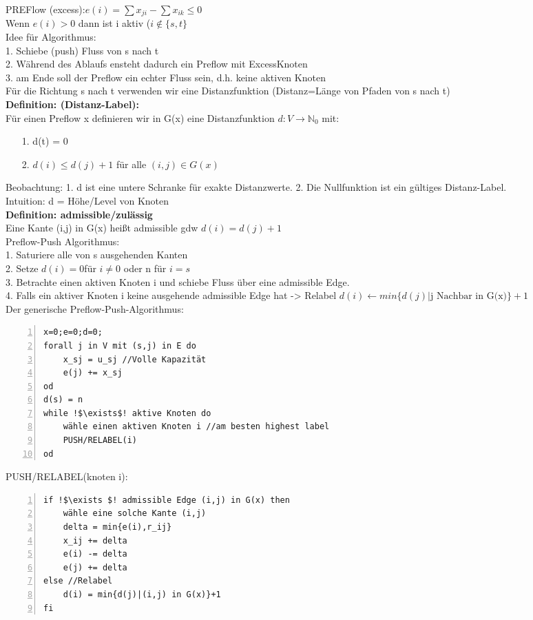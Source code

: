 \documentclass[a4paper]{article}
\begin{document}
PREFlow (excess):$e(i)=\sum x_{ji} - \sum x_{ik} \leq 0$\\
Wenn $e(i)>0$ dann ist i aktiv ($i\not\in \{s,t\}$\\
Idee für Algorithmus:\\
1. Schiebe (push) Fluss von s nach t\\
2. Während des Ablaufs ensteht dadurch ein Preflow mit ExcessKnoten\\
3. am Ende soll der Preflow ein echter Fluss sein, d.h. keine aktiven Knoten\\
Für die Richtung s nach t verwenden wir eine Distanzfunktion (Distanz=Länge von Pfaden von s nach t)\\
\textbf{Definition: (Distanz-Label):}\\
Für einen Preflow x definieren wir in G(x) eine Distanzfunktion $d: V\rightarrow \mathbb{N}_0$ mit:
\begin{itemize}
\item[1.]d(t) = 0
\item[2.]$d(i)\leq d(j)+1$ für alle $(i,j)\in G(x)$
\end{itemize}
Beobachtung: 1. d ist eine untere Schranke für exakte Distanzwerte. 2. Die Nullfunktion ist ein gültiges Distanz-Label.\\
Intuition: d = Höhe/Level von Knoten\\
\textbf{Definition: admissible/zulässig}\\
Eine Kante (i,j) in G(x) heißt admissible gdw $d(i)=d(j)+1$\\
Preflow-Push Algorithmus:\\
1. Saturiere alle von s ausgehenden Kanten\\
2. Setze $d(i) = 0 $für $i\neq 0$ oder n für $i=s$\\
3. Betrachte einen aktiven Knoten i und schiebe Fluss über eine admissible Edge.\\
4. Falls ein aktiver Knoten i keine ausgehende admissible Edge hat -> Relabel $d(i)\leftarrow min\{d(j)|\text{j Nachbar in G(x)}\}+1$\\
Der generische Preflow-Push-Algorithmus:\\
\begin{lstlisting}[numbers=left,escapechar=!]
x=0;e=0;d=0;
forall j in V mit (s,j) in E do
	x_sj = u_sj //Volle Kapazität
	e(j) += x_sj
od
d(s) = n
while !$\exists$! aktive Knoten do
	wähle einen aktiven Knoten i //am besten highest label
	PUSH/RELABEL(i)
od
\end{lstlisting}
PUSH/RELABEL(knoten i):
\begin{lstlisting}[numbers=left,escapechar=!]
if !$\exists $! admissible Edge (i,j) in G(x) then
	wähle eine solche Kante (i,j)
	delta = min{e(i),r_ij}
	x_ij += delta
	e(i) -= delta
	e(j) += delta
else //Relabel
	d(i) = min{d(j)|(i,j) in G(x)}+1
fi
\end{lstlisting}
\end{document}
